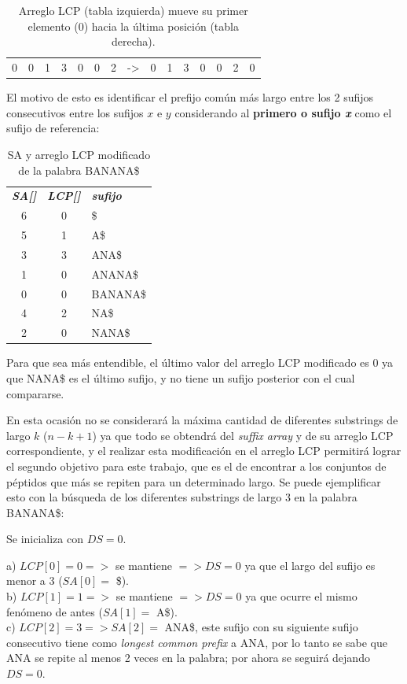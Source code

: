 \begin{table}[h]
\centering
\label{propuesta-2}
\begin{tabular}{|l|l|l|l|l|l|l|l|l|l|l|l|l|l|l|}
\cline{1-7} \cline{9-15}
0 & 0 & 1 & 3 & 0 & 0 & 2 & -\textgreater & 0 & 1 & 3 & 0 & 0 & 2 & 0 \\ \cline{1-7} \cline{9-15} 
\end{tabular}
\caption{Arreglo LCP (tabla izquierda) mueve su primer elemento (0) hacia la última posición (tabla derecha).}
\end{table}

El motivo de esto es identificar el prefijo común más largo entre los 2 sufijos consecutivos entre los sufijos $x$ e $y$ considerando al {\textbf{primero o sufijo \textit{x}}} como el sufijo de referencia:

\begin{table}[H]
	\centering
	\label{propuesta-21}
	\begin{tabular}{c c l}
		\textit{\textbf{SA[]}} & \textit{\textbf{LCP[]}} &\textit{\textbf{sufijo}}\\
		6 & 0 & \$\\
		5 & 1 & A\$\\
		3 & 3 & ANA\$\\
		1 & 0 & ANANA\$\\
		0 & 0 & BANANA\$\\
		4 & 2 & NA\$\\
		2 & 0 & NANA\$\\
	\end{tabular}
\caption{SA y arreglo LCP modificado de la palabra BANANA\$}
\end{table}

Para que sea más entendible, el último valor del arreglo LCP modificado es 0 ya que NANA\$ es el último sufijo, y no tiene un sufijo posterior con el cual compararse.

En esta ocasión no se considerará la máxima cantidad de diferentes substrings de largo $k$ ($n-k+1$) ya que todo se obtendrá del \textit{suffix array} y de su arreglo LCP correspondiente, y el realizar esta modificación en el arreglo LCP permitirá lograr el segundo objetivo para este trabajo, que es el de encontrar a los conjuntos de péptidos que más se repiten para un determinado largo. Se puede ejemplificar esto con la búsqueda de los diferentes substrings de largo 3 en la palabra BANANA\$:

Se inicializa con $DS = 0$.

a) $LCP[0]=0 =>$ se mantiene $=> DS=0$ ya que el largo del sufijo es menor a 3 ($SA[0]=$ \$).\\
b) $LCP[1]=1 =>$ se mantiene $=> DS=0$ ya que ocurre el mismo fenómeno de antes ($SA[1]=$ A\$).\\ 
c) $LCP[2]=3 => SA[2] =$ ANA\$, este sufijo con su siguiente sufijo consecutivo tiene como \textit{longest common prefix} a ANA, por lo tanto se sabe que ANA se repite al menos 2 veces en la palabra; por ahora se seguirá dejando $DS = 0$.

